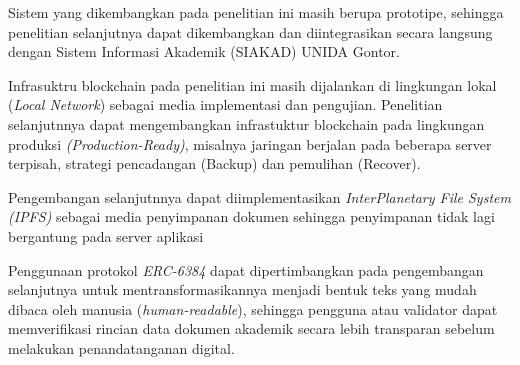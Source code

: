 	\begin{subsecenumerate}
		\item Sistem yang dikembangkan pada penelitian ini masih berupa prototipe, sehingga penelitian selanjutnya dapat dikembangkan dan diintegrasikan secara langsung dengan Sistem Informasi Akademik (SIAKAD) UNIDA Gontor. 
		\item Infrasuktru blockchain pada penelitian ini masih dijalankan di lingkungan lokal (\textit{Local Network}) sebagai media implementasi dan pengujian. Penelitian selanjutnnya dapat mengembangkan infrastuktur blockchain pada lingkungan produksi \textit{(Production-Ready)}, misalnya jaringan berjalan pada beberapa server terpisah, strategi pencadangan (Backup) dan pemulihan (Recover).
		\item Pengembangan selanjutnnya dapat diimplementasikan \textit{InterPlanetary File System (IPFS)} sebagai media penyimpanan dokumen sehingga penyimpanan tidak lagi bergantung pada server aplikasi
		\item Penggunaan protokol \textit{ERC-6384} dapat dipertimbangkan pada pengembangan selanjutnya untuk mentransformasikannya menjadi bentuk teks yang mudah dibaca oleh manusia (\textit{human-readable}), sehingga pengguna atau validator dapat memverifikasi rincian data dokumen akademik secara lebih transparan sebelum melakukan penandatanganan digital.
	\end{subsecenumerate}